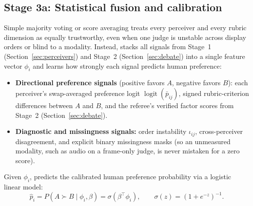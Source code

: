 \subsection{Stage 3a: Statistical fusion and calibration}
\label{sec:fusion}
Simple majority voting or score averaging treats every perceiver and every rubric dimension as equally trustworthy, even when one judge is unstable across display orders or blind to a modality. Instead, \critical stacks all signals from Stage~1 (Section~\ref{sec:perceivers}) and Stage~2 (Section~\ref{sec:debate}) into a single feature vector $\phi_i$ and learns how strongly each signal predicts human preference:
\begin{itemize}[leftmargin=*, topsep=2pt, itemsep=1pt]
  \item \textbf{Directional preference signals} (positive favors $A$, negative favors $B$): each perceiver's swap-averaged preference logit $\operatorname{logit}(\bar p_{ij})$, signed rubric-criterion differences between $A$ and $B$, and the referee's verified factor scores from Stage~2 (Section~\ref{sec:debate}).
  \item \textbf{Diagnostic and missingness signals:} order instability $\iota_{ij}$, cross-perceiver disagreement, and explicit binary missingness masks (so an unmeasured modality, such as audio on a frame-only judge, is never mistaken for a zero score).
\end{itemize}
Given $\phi_i$, \critical predicts the calibrated human preference probability via a logistic linear model:
\begin{equation}
\hat p_i = P(A\succ B\mid \phi_i,\beta)=\sigma(\beta^\top\phi_i),\qquad
\sigma(z)=(1+e^{-z})^{-1}.
\label{eq:bt}
\end{equation}

